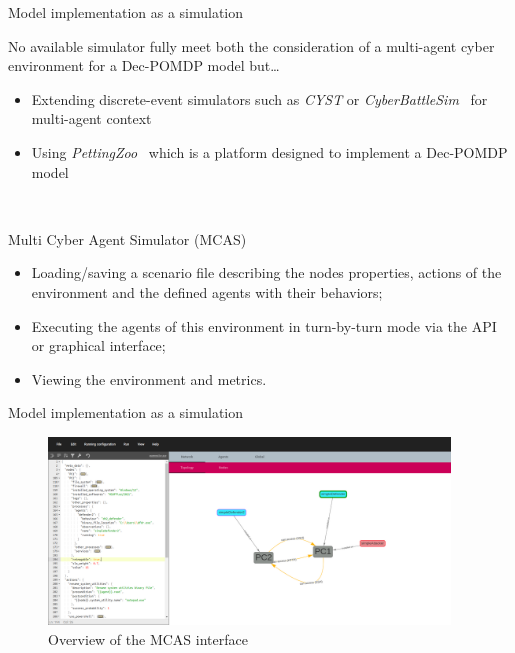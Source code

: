         \begin{frame}{Model implementation as a simulation}
            {}

            No available simulator fully meet both the consideration of a multi-agent cyber environment for a Dec-POMDP model but\dots

            \begin{itemize}
                \item Extending discrete-event simulators such as \textit{CYST}\cite{drasar_session-level_2020} or \textit{CyberBattleSim}~\cite{cyberbattlesim} for multi-agent context
                \item Using \textit{PettingZoo}~\cite{jk2020} which is a platform designed to implement a Dec-POMDP model
            \end{itemize}

            \

            \begin{block}{Multi Cyber Agent Simulator (MCAS)~\cite{MCASWebsite}}

                \begin{itemize}
                    \item Loading/saving a scenario file describing the nodes properties, actions of the environment and the defined agents with their behaviors;
                    \item Executing the agents of this environment in turn-by-turn mode via the API or graphical interface;
                    \item Viewing the environment and metrics.
                \end{itemize}

            \end{block}

        \end{frame}

        
        \begin{frame}{Model implementation as a simulation}
            {}

            \begin{figure}
                \centering
                \includegraphics[width=0.95\textwidth]{figures/interface_MCAS.png}
                \caption{Overview of the MCAS interface}
                \label{fig:interface_simulateur}
            \end{figure}
        
        \end{frame}

